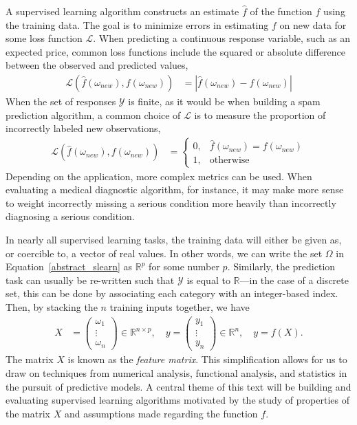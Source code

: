 \documentclass[12pt,hidelinks]{article}
\numberwithin{equation}{section}
\begin{document}
A supervised learning algorithm constructs an estimate $\widehat{f}$ of the
function $f$ using the training data. The goal is to minimize errors in
estimating $f$ on new data for some loss function $\mathcal{L}$.
When predicting a continuous response variable, such as an expected price,
common loss functions include the squared or absolute difference between the
observed and predicted values,
\begin{align}
\mathcal{L} (\widehat{f}(\omega_{new}), f(\omega_{new})) &=
\left| \widehat{f}(\omega_{new}) - f(\omega_{new}) \right|
\end{align}
When the set of responses $\mathcal{Y}$ is
finite, as it would be when building a spam prediction algorithm, a common choice
of $\mathcal{L}$ is to measure the proportion of incorrectly labeled new
observations,
\begin{align}
\mathcal{L} (\widehat{f}(\omega_{new}), f(\omega_{new})) &=
\begin{cases} 0, & \widehat{f}(\omega_{new}) = f(\omega_{new}) \\
1, & \text{otherwise}  \end{cases}
\end{align}
Depending on the application, more complex metrics can be used. When
evaluating a medical diagnostic algorithm, for instance, it may make more
sense to weight incorrectly missing a serious condition more heavily than
incorrectly diagnosing a serious condition.

In nearly all supervised learning tasks, the training data will either be
given as, or coercible to, a vector of real values. In other words, we can
write the set $\Omega$ in Equation~\ref{abstract_slearn} as $\mathbb{R}^p$ for
some number $p$. Similarly, the prediction task can usually be re-written such
that $\mathcal{Y}$ is equal to $\mathbb{R}$---in the case of a discrete set,
this can be done by associating each category with an integer-based index.
Then, by stacking the $n$ training inputs together, we have
\begin{align}
X &= \begin{pmatrix} \omega_1 \\ \vdots \\ \omega_n \end{pmatrix} \in
\mathbb{R}^{n\times p}, \quad y =
\begin{pmatrix} y_1 \\ \vdots \\ y_n \end{pmatrix} \in \mathbb{R}^{n},
\quad y = f(X).
\end{align}
The matrix $X$ is known as the \textit{feature matrix}.
This simplification allows for us to draw on techniques from numerical
analysis, functional analysis, and statistics in the pursuit of predictive
models. A central theme of this text will be building and evaluating
supervised learning algorithms motivated by the study of properties of the
matrix $X$ and assumptions made regarding the function $f$.
\end{document}
